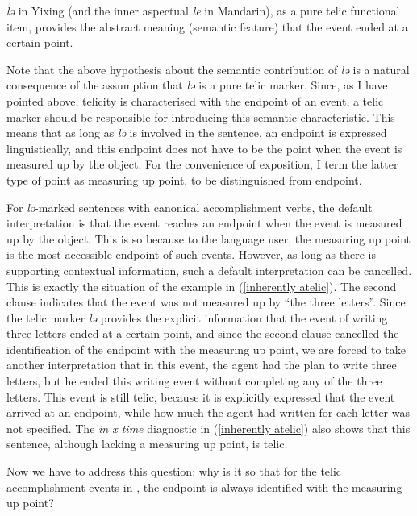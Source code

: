 \documentclass[output=paper]{langsci/langscibook}
\begin{document}
\begin{exe}
\ex\label{le hypothesis} \emph{lə} in Yixing (and the inner aspectual \emph{le} in Mandarin), as a pure telic functional item, provides the abstract meaning (semantic feature) that the event ended at a certain point.
\end{exe}

Note that the above hypothesis about the semantic contribution of \emph{lə} is a natural consequence of the assumption that \emph{lə} is a pure telic marker. Since, as I have pointed above, telicity is characterised with the endpoint of an event, a telic marker should be responsible for introducing this semantic characteristic. This means that as long as \emph{lə} is involved in the sentence, an endpoint is expressed linguistically, and this endpoint does not have to be the point when the event is measured up by the object. For the convenience of exposition, I term the latter type of point as measuring up point, to be distinguished from endpoint.


For \emph{lə}-marked sentences with canonical accomplishment verbs, the default
interpretation is that the event reaches an endpoint when the event is measured
up by the object. This is so because to the language user, the measuring up
point is the most accessible endpoint of such events. However, as long as there
is supporting contextual information, such a default interpretation can be
cancelled. This is exactly the situation of the example in (\ref{inherently
atelic}). The second clause indicates that the event was not measured up by
\enquote{the three letters}. Since the telic marker \emph{lə} provides the explicit
information that the event of writing three letters ended at a certain point,
and since the second clause cancelled the identification of the endpoint with
the measuring up point, we are forced to take another interpretation that in
this event, the agent had the plan to write three letters, but he ended this
writing event without completing any of the three letters. This event is still
telic, because it is explicitly expressed that the event arrived at an
endpoint, while how much the agent had written for each letter was not
specified. The \emph{in x time} diagnostic in (\ref{inherently atelic}) also
shows that this sentence, although lacking a measuring up point, is telic.


Now we have to address this question: why is it so that for the telic accomplishment events in , the endpoint is always identified with the measuring up point?
\end{document}
